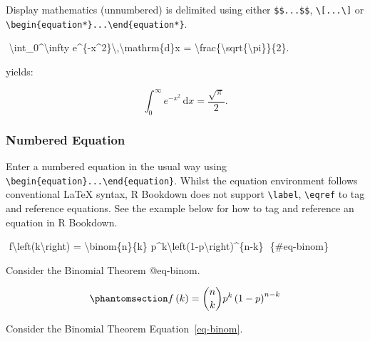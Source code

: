 \documentclass[
  letterpaper,
  oneside]{book}
\newenvironment{Shaded}{\begin{snugshade}}{\end{snugshade}}
\newcommand{\NormalTok}[1]{\textcolor[rgb]{0.00,0.23,0.31}{#1}}
\numberwithin{equation}{section}
\numberwithin{figure}{section}
\theoremstyle{break}
\theoremstyle{plain}
\theoremstyle{remark}
\begin{document}
Display mathematics (unnumbered) is delimited using either
\texttt{\$\$...\$\$}, \texttt{\textbackslash{}{[}...\textbackslash{}{]}}
or
\texttt{\textbackslash{}begin\{equation*\}...\textbackslash{}end\{equation*\}}.

\begin{Shaded}
\begin{Highlighting}[]
\NormalTok{$$}
\NormalTok{ \textbackslash{}int\_0\^{}\textbackslash{}infty e\^{}\{{-}x\^{}2\}\textbackslash{},\textbackslash{}mathrm\{d\}x = \textbackslash{}frac\{\textbackslash{}sqrt\{\textbackslash{}pi\}\}\{2\}. }
\NormalTok{$$}
\end{Highlighting}
\end{Shaded}

yields:

\[
 \int_0^\infty e^{-x^2}\,\mathrm{d}x = \frac{\sqrt{\pi}}{2}. 
\]

\subsubsection*{Numbered Equation}\label{numbered-equation}

Enter a numbered equation in the usual way using
\texttt{\textbackslash{}begin\{equation\}...\textbackslash{}end\{equation\}}.
Whilst the equation environment follows conventional LaTeX syntax, R
Bookdown does not support \texttt{\textbackslash{}label},
\texttt{\textbackslash{}eqref} to tag and reference equations. See the
example below for how to tag and reference an equation in R Bookdown.

\label{EqRef}
\begin{Shaded}
\begin{Highlighting}[]
\NormalTok{$$}
\NormalTok{  f\textbackslash{}left(k\textbackslash{}right) = \textbackslash{}binom\{n\}\{k\} p\^{}k\textbackslash{}left(1{-}p\textbackslash{}right)\^{}\{n{-}k\}}
\NormalTok{$$ \{\#eq{-}binom\}}
    
\NormalTok{Consider the Binomial Theorem @eq{-}binom.}
\end{Highlighting}
\end{Shaded}

\begin{equation}\phantomsection\label{eq-binom}{
f\left(k\right) = \binom{n}{k} p^k\left(1-p\right)^{n-k}
}\end{equation}

Consider the Binomial Theorem Equation~\ref{eq-binom}.
\end{document}
